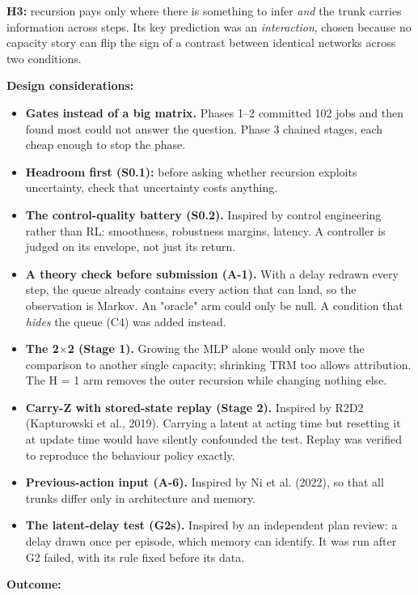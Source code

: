 \documentclass[11pt]{article}
\begin{document}
\textbf{H3:} recursion pays only where there is something to infer \emph{and} the trunk carries information across steps. Its key prediction was an \emph{interaction}, chosen because no capacity story can flip the sign of a contrast between identical networks across two conditions.



\textbf{Design considerations:}

\begin{itemize}
\item \textbf{Gates instead of a big matrix.} Phases 1--2 committed 102 jobs and then found most could not answer the question. Phase 3 chained stages, each cheap enough to stop the phase.
\item \textbf{Headroom first (S0.1):} before asking whether recursion exploits uncertainty, check that uncertainty costs anything.
\item \textbf{The control-quality battery (S0.2).} Inspired by control engineering rather than RL: smoothness, robustness margins, latency. A controller is judged on its envelope, not just its return.
\item \textbf{A theory check before submission (A-1).} With a delay redrawn every step, the queue already contains every action that can land, so the observation is Markov. An "oracle" arm could only be null. A condition that \emph{hides} the queue (C4) was added instead.
\item \textbf{The 2$\times$2 (Stage 1).} Growing the MLP alone would only move the comparison to another single capacity; shrinking TRM too allows attribution. The H = 1 arm removes the outer recursion while changing nothing else.
\item \textbf{Carry-Z with stored-state replay (Stage 2).} Inspired by R2D2 (Kapturowski et al., 2019). Carrying a latent at acting time but resetting it at update time would have silently confounded the test. Replay was verified to reproduce the behaviour policy exactly.
\item \textbf{Previous-action input (A-6).} Inspired by Ni et al. (2022), so that all trunks differ only in architecture and memory.
\item \textbf{The latent-delay test (G2s).} Inspired by an independent plan review: a delay drawn once per episode, which memory can identify. It was run after G2 failed, with its rule fixed before its data.
\end{itemize}



\textbf{Outcome:}
\end{document}
